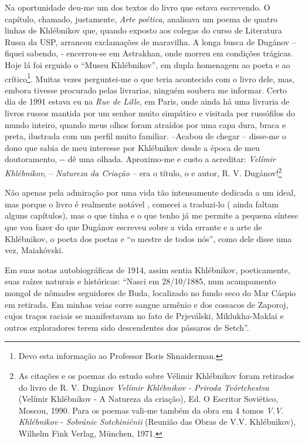 Na oportunidade deu-me um dos textos do livro que estava escrevendo. O
capítulo, chamado, justamente, \emph{Arte poética}, analisava um poema
de quatro linhas de Khlébnikov que, quando exposto aos colegas do curso
de Literatura Russa da USP, arrancou exclamações de maravilha. A longa
busca de Dugánov -- fiquei sabendo, - encerrou-se em Astrakhan, onde
morreu em condições trágicas. Hoje lá foi erguido o ``Museu
Khlébnikov'', em dupla homenagem ao poeta e ao crítico\footnote{Devo
  esta informação ao Professor Boris Shnaiderman.}. Muitas vezes
perguntei-me o que teria acontecido com o livro dele, mas, embora
tivesse procurado pelas livrarias, ninguém soubera me informar. Certo
dia de 1991 estava eu na \emph{Rue de Lille}, em Paris, onde ainda há
uma livraria de livros russos mantida por um senhor muito simpático e
visitada por russófilos do mundo inteiro, quando meus olhos foram
atraídos por uma capa dura, braca e preta, ilustrada com um perfil muito
familiar. --Acabou de chegar -- disse-me o dono que sabia de meu
interesse por Khlébnikov desde a época de meu doutoramento, -\/- dê uma
olhada. Aproximo-me e custo a acreditar: \emph{Velímir Khlébnikov}, --
\emph{Natureza da Criação --} era o título, o e autor, R. V.
Dugánov!\footnote{As citações e os poemas do estudo sobre Vélimir
  Khlébnikov foram retirados do livro de R. V. Dugánov \emph{Velímir
  Khlébnikov - Priroda Tvórtchestva} (Velímir Khlébnikov - A Natureza da
  criação), Ed. O Escritor Soviético, Moscou, 1990. Para os poemas
  vali-me também da obra em 4 tomos \emph{V.V. Khlébnikov} -
  \emph{Sobránie Sotchiniénii} (Reunião das Obras de V.V. Khlébnikov),
  Wilhelm Fink Verlag, München, 1971.}

Não apenas pela admiração por uma vida tão intensamente dedicada a um
ideal, mas porque o livro é realmente notável , comecei a traduzi-lo (
ainda faltam alguns capítulos), mas o que tinha e o que tenho já me
permite a pequena síntese que vou fazer do que Dugánov escreveu sobre a
vida errante e a arte de Khlébnikov, o poeta dos poetas e ``o mestre de
todos nós'', como dele disse uma vez, Maiakóvski.

Em suas notas autobiográficas de 1914, assim sentia Khlébnikov,
poeticamente, suas raízes naturais e históricas: ``Nasci em 28/10/1885,
num acampamento mongol de nômades seguidores de Buda, localizado no
fundo seco do Mar Cáspio em retirada. Em minhas veias corre sangue
armênio e dos cossacos de Zaporoj, cujos traços raciais se manifestavam
no fato de Prjeválski, Miklukha-Maklai e outros exploradores terem sido
descendentes dos pássaros de Setch''.

